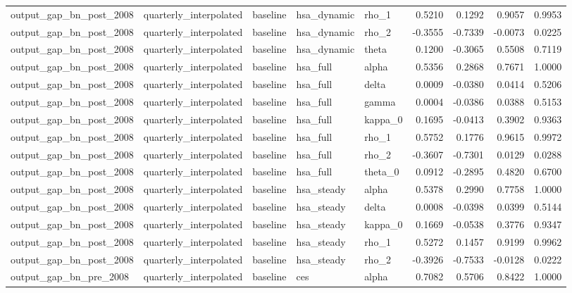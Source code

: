 \begin{tabular}{lllllrrrr}
output\_gap\_bn\_post\_2008 & quarterly\_interpolated & baseline & hsa\_dynamic & rho\_1 & 0.5210 & 0.1292 & 0.9057 & 0.9953 \\
output\_gap\_bn\_post\_2008 & quarterly\_interpolated & baseline & hsa\_dynamic & rho\_2 & -0.3555 & -0.7339 & -0.0073 & 0.0225 \\
output\_gap\_bn\_post\_2008 & quarterly\_interpolated & baseline & hsa\_dynamic & theta & 0.1200 & -0.3065 & 0.5508 & 0.7119 \\
output\_gap\_bn\_post\_2008 & quarterly\_interpolated & baseline & hsa\_full & alpha & 0.5356 & 0.2868 & 0.7671 & 1.0000 \\
output\_gap\_bn\_post\_2008 & quarterly\_interpolated & baseline & hsa\_full & delta & 0.0009 & -0.0380 & 0.0414 & 0.5206 \\
output\_gap\_bn\_post\_2008 & quarterly\_interpolated & baseline & hsa\_full & gamma & 0.0004 & -0.0386 & 0.0388 & 0.5153 \\
output\_gap\_bn\_post\_2008 & quarterly\_interpolated & baseline & hsa\_full & kappa\_0 & 0.1695 & -0.0413 & 0.3902 & 0.9363 \\
output\_gap\_bn\_post\_2008 & quarterly\_interpolated & baseline & hsa\_full & rho\_1 & 0.5752 & 0.1776 & 0.9615 & 0.9972 \\
output\_gap\_bn\_post\_2008 & quarterly\_interpolated & baseline & hsa\_full & rho\_2 & -0.3607 & -0.7301 & 0.0129 & 0.0288 \\
output\_gap\_bn\_post\_2008 & quarterly\_interpolated & baseline & hsa\_full & theta\_0 & 0.0912 & -0.2895 & 0.4820 & 0.6700 \\
output\_gap\_bn\_post\_2008 & quarterly\_interpolated & baseline & hsa\_steady & alpha & 0.5378 & 0.2990 & 0.7758 & 1.0000 \\
output\_gap\_bn\_post\_2008 & quarterly\_interpolated & baseline & hsa\_steady & delta & 0.0008 & -0.0398 & 0.0399 & 0.5144 \\
output\_gap\_bn\_post\_2008 & quarterly\_interpolated & baseline & hsa\_steady & kappa\_0 & 0.1669 & -0.0538 & 0.3776 & 0.9347 \\
output\_gap\_bn\_post\_2008 & quarterly\_interpolated & baseline & hsa\_steady & rho\_1 & 0.5272 & 0.1457 & 0.9199 & 0.9962 \\
output\_gap\_bn\_post\_2008 & quarterly\_interpolated & baseline & hsa\_steady & rho\_2 & -0.3926 & -0.7533 & -0.0128 & 0.0222 \\
output\_gap\_bn\_pre\_2008 & quarterly\_interpolated & baseline & ces & alpha & 0.7082 & 0.5706 & 0.8422 & 1.0000 \\

\end{tabular}
